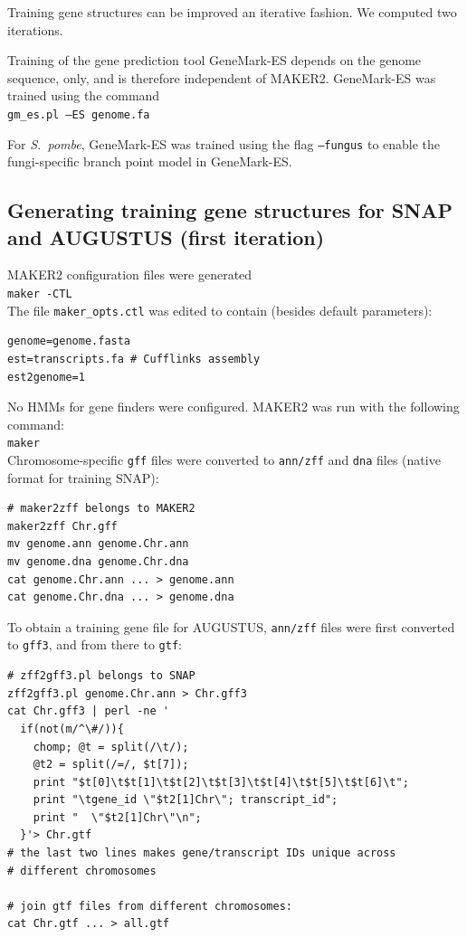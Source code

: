 \documentclass[a4paper,10pt]{report}
\begin{document}
\noindent Training gene structures can be improved an iterative fashion. We computed two iterations.

Training of the gene prediction tool GeneMark-ES depends on the genome sequence, only, and is therefore independent of MAKER2. GeneMark-ES was trained using the command\\

\noindent \texttt{gm\_es.pl --ES genome.fa}

\noindent For \textit{S.~pombe}, GeneMark-ES was trained using the flag \texttt{--fungus} to enable the fungi-specific branch point model in GeneMark-ES.

\subsection{Generating training gene structures for SNAP and AUGUSTUS (first iteration)} \label{training_genes_it1}

MAKER2 configuration files were generated\\

\noindent \texttt{maker -CTL}\\

\noindent The file \texttt{maker\_opts.ctl} was edited to contain (besides default parameters):

\begin{verbatim}
genome=genome.fasta
est=transcripts.fa # Cufflinks assembly
est2genome=1
\end{verbatim}

\noindent No HMMs for gene finders were configured. MAKER2 was run with the following command:\\

\noindent \texttt{maker}\\

\noindent Chromosome-specific \texttt{gff} files were converted to \texttt{ann/zff} and \texttt{dna} files (native format for training SNAP):

\begin{verbatim}
# maker2zff belongs to MAKER2
maker2zff Chr.gff
mv genome.ann genome.Chr.ann
mv genome.dna genome.Chr.dna
cat genome.Chr.ann ... > genome.ann
cat genome.Chr.dna ... > genome.dna
\end{verbatim}

\noindent To obtain a training gene file for AUGUSTUS, \texttt{ann/zff} files were first converted to \texttt{gff3}, and from there to \texttt{gtf}:

\begin{verbatim}
# zff2gff3.pl belongs to SNAP
zff2gff3.pl genome.Chr.ann > Chr.gff3
cat Chr.gff3 | perl -ne '
  if(not(m/^\#/)){
    chomp; @t = split(/\t/); 
    @t2 = split(/=/, $t[7]);
    print "$t[0]\t$t[1]\t$t[2]\t$t[3]\t$t[4]\t$t[5]\t$t[6]\t";
    print "\tgene_id \"$t2[1]Chr\"; transcript_id"; 
    print "  \"$t2[1]Chr\"\n";
  }'> Chr.gtf
# the last two lines makes gene/transcript IDs unique across 
# different chromosomes

# join gtf files from different chromosomes:
cat Chr.gtf ... > all.gtf
\end{verbatim}
\end{document}
